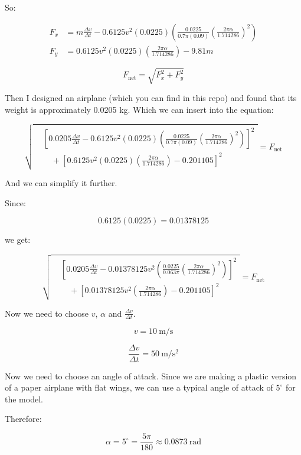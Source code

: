 \documentclass[12pt]{article}
\begin{document}
So:

\[
\begin{aligned}
F_x
&=
m\frac{\Delta v}{\Delta t}
-
0.6125v^2(0.0225)
\left(
\frac{0.0225}{0.7\pi(0.09)}
\left(
\frac{2\pi\alpha}{1.714286}
\right)^2
\right)
\\[2mm]
F_y
&=
0.6125v^2(0.0225)
\left(
\frac{2\pi\alpha}{1.714286}
\right)
-9.81m
\end{aligned}
\]

\[
F_{\mathrm{net}}
=
\sqrt{F_x^2+F_y^2}
\]

Then I designed an airplane (which you can find in this repo) and found that its weight is approximately 0.0205 kg. Which we can insert into the equation:

\[
\sqrt{
\begin{aligned}
&
\left[
0.0205\frac{\Delta v}{\Delta t}
-
0.6125v^2(0.0225)
\left(
\frac{0.0225}{0.7\pi(0.09)}
\left(
\frac{2\pi\alpha}{1.714286}
\right)^2
\right)
\right]^2
\\[2mm]
&\quad+
\left[
0.6125v^2(0.0225)
\left(
\frac{2\pi\alpha}{1.714286}
\right)
-0.201105
\right]^2
\end{aligned}
}
=
F_{\mathrm{net}}
\]

And we can simplify it further.

Since:

\[
0.6125(0.0225)=0.01378125
\]

we get:

\[
\sqrt{
\begin{aligned}
&
\left[
0.0205\frac{\Delta v}{\Delta t}
-
0.01378125v^2
\left(
\frac{0.0225}{0.063\pi}
\left(
\frac{2\pi\alpha}{1.714286}
\right)^2
\right)
\right]^2
\\[2mm]
&\quad+
\left[
0.01378125v^2
\left(
\frac{2\pi\alpha}{1.714286}
\right)
-0.201105
\right]^2
\end{aligned}
}
=
F_{\mathrm{net}}
\]

Now we need to choose $v$, $\alpha$ and $\frac{\Delta v}{\Delta t}$.

\[
v=10\ \mathrm{m/s}
\]

\[
\frac{\Delta v}{\Delta t}=50\ \mathrm{m/s^2}
\]

Now we need to choose an angle of attack. Since we are making a plastic version of a paper airplane with flat wings, we can use a typical angle of attack of $5^\circ$ for the model.

Therefore:

\[
\alpha=5^\circ=\frac{5\pi}{180}\approx0.0873\ \mathrm{rad}
\]
\end{document}
